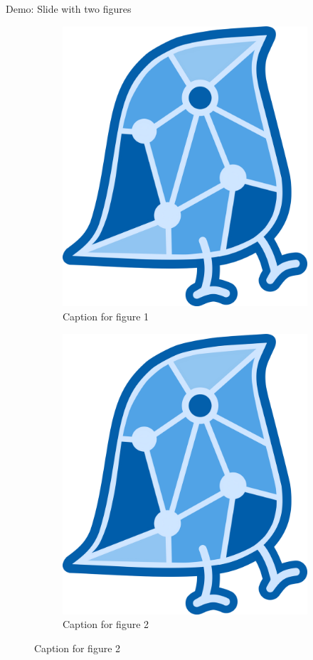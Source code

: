 \documentclass{beamer}
\begin{document}
\begin{frame}{Demo: Slide with two figures}

\begin{figure}
\centering
\begin{subfigure}{.5\textwidth}
  \includegraphics[width=0.7\linewidth]{images/WAG.png}
  \caption{Caption for figure 1}
\end{subfigure}%
\centering
\begin{subfigure}{.5\textwidth}
  \includegraphics[width=0.7\linewidth]{images/WAG.png}
  \caption{Caption for figure 2}
\end{subfigure}
\end{figure}

\end{frame}
\end{document}
